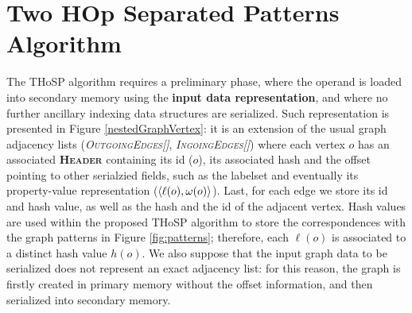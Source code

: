 \section{Two HOp Separated Patterns Algorithm}
\label{sec:THOSPA}
The THoSP algorithm requires a preliminary phase, where the operand is loaded into secondary memory using the \textbf{input data  representation}, and where no further ancillary indexing data structures are serialized. Such representation is presented in Figure \ref{nestedGraphVertex}: it is an extension of the usual graph adjacency lists (\textit{\textsc{OutgoingEdges[]}}, \textit{\textsc{IngoingEdges[]}}) where each vertex $o$ has an associated \textbf{\textsc{Header}} containing its id ($o$), its associated hash and the offset pointing to other serialzied fields, such as the labelset and eventually its property-value representation ($\Braket{\ell(o),\omega(o)}$). Last, for each edge we store its id and hash value, as well as the hash and the id of the adjacent vertex. Hash values are used within the proposed THoSP algorithm to store the correspondences with the graph patterns in Figure \ref{fig:patterns}; therefore, each $\ell(o)$ is associated to a distinct hash value  $h(o)$. We also suppose that the input graph data to be serialized does not represent an exact adjacency list: for this reason, the graph is firstly created in primary memory without the offset information, and then serialized into secondary memory. 

